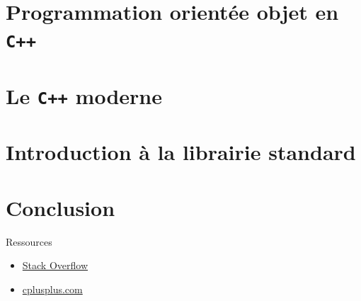 \documentclass{beamer}
\numberwithin{equation}{section}
\begin{document}
\section{Programmation orientée objet en \texttt{C++}}
\label{sec:poo}



\section{Le \texttt{C++} moderne}


\section{Introduction à la librairie standard}


\section*{Conclusion}
\label{sec:conclusion}
\begin{frame}{Ressources}
  \begin{itemize}
    \item \href{https://stackoverflow.com/}{Stack Overflow}
    \item \href{http://www.cplusplus.com/}{cplusplus.com}
  \end{itemize}
\end{frame}
\end{document}
